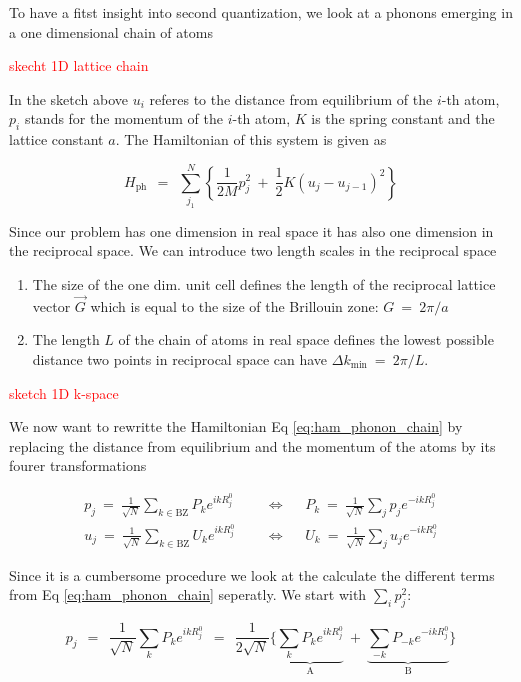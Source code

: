 \documentclass[10pt]{report}
\numberwithin{equation}{chapter}
\newcommand{\refEq}[1]{
  Eq  \ref{#1}
}
\begin{document}
To have a fitst insight into second quantization, we look at a phonons emerging in a one dimensional chain of atoms

\textcolor{red}{skecht 1D lattice chain}


In the sketch above $u_i$ referes to the distance from equilibrium of the $i$-th atom, $p_i$ stands for the momentum of the $i$-th atom, $K$ is the spring constant and the lattice constant $a$.
The Hamiltonian of this system is given as

\begin{equation} \label{eq:ham_phonon_chain}
  H_\text{ph} ~~=~~ \sum_{j_1}^N \left\{ \frac{1}{2M} p_j^2 ~+~ \frac{1}{2} K (u_j - u_{j-1})^2 \right\}
\end{equation}

Since our problem has one dimension in real space it has also one dimension in the reciprocal space. We can introduce two length scales in the reciprocal space

\begin{enumerate}
  \item{The size of the one dim. unit cell defines the length of the reciprocal lattice vector $\vec{G}$ which is equal to the size of the Brillouin zone: $ G ~=~ 2\pi/a$}
  \item{The length $L$ of the chain of atoms in real space defines the lowest possible distance two points in reciprocal space can have $\Delta k_\text{min} ~=~ 2\pi/L$.}
\end{enumerate}


\textcolor{red}{sketch 1D k-space}


We now want to rewritte the Hamiltonian \refEq{eq:ham_phonon_chain} by replacing the distance from equilibrium and the momentum of the atoms by its fourer transformations

\begin{align}
  p_j ~=~ \frac{1}{\sqrt{N}} \sum_{k \in \text{BZ}} P_k e^{ikR^0_j} 
  ~~~~~~& \Longleftrightarrow~~~~~~
  P_k ~=~ \frac{1}{\sqrt{N}} \sum_{j} p_j e^{-ikR^0_j}\\
  u_j ~=~ \frac{1}{\sqrt{N}} \sum_{k \in \text{BZ}} U_k e^{ikR^0_j} 
  ~~~~~~& \Longleftrightarrow~~~~~~
  U_k ~=~ \frac{1}{\sqrt{N}} \sum_{j} u_j e^{-ikR^0_j}
\end{align}


Since it is a cumbersome procedure we look at the calculate the different terms from \refEq{eq:ham_phonon_chain} seperatly.
We start with $\sum_i p_j^2$:

\begin{equation}\label{eq:phonon_momentum}
  p_j ~~=~~ \frac{1}{\sqrt{N}} \sum_k P_k e^{ikR^0_j} ~~=~~ 
  \frac{1}{2\sqrt{N}} \bigg\{ 
  \underbrace{\sum_k P_k e^{ikR^0_j}}_\text{A} ~+~
  \underbrace{\sum_{-k} P_{-k} e^{-ikR^0_j}}_\text{B} \bigg\}
\end{equation}
\end{document}
